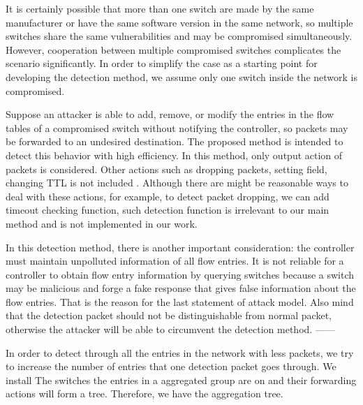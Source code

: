 It is certainly possible that more than one switch are made by the same manufacturer or have the same software version in the same network, so multiple switches share the same vulnerabilities and may be compromised simultaneously. However, cooperation between multiple compromised switches complicates the scenario significantly. In order to simplify the case as a starting point for developing the detection method, we assume only one switch inside the network is compromised.

Suppose an attacker is able to add, remove, or modify the entries in the flow tables of a compromised
switch without notifying the controller, so packets may be forwarded to an undesired destination. The proposed method is intended to detect this behavior with high efficiency. In this method, only output action of packets is considered. Other actions such as dropping packets, setting field, changing TTL is not included \sout{}. Although there are might be reasonable ways to deal with these actions, for example, to detect packet dropping, we can add timeout checking function, such detection function is irrelevant to our main method and is not implemented in our work.

In this detection method, there is another important consideration: the controller must maintain unpolluted information of all flow entries. It is not reliable for a controller to obtain flow entry information by querying switches because a switch may be malicious and forge a fake response that gives false information about the flow entries. That is the reason for the last statement of attack model. Also mind that the detection packet should not be distinguishable from normal packet, otherwise the attacker will be able to circumvent the detection method. 
------



In order to detect through all the entries in the network with less packets, we try to increase the number of entries that one detection packet goes through. We install  The switches the entries in a aggregated group are on and their forwarding actions will form a tree. Therefore, we have the aggregation tree. 

 